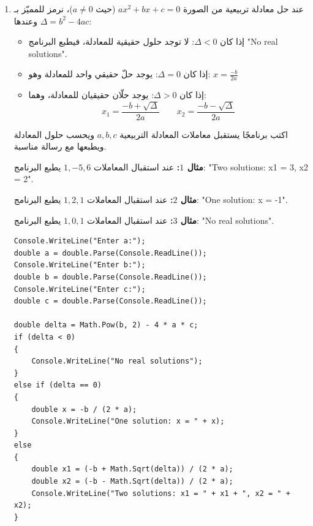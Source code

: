 \documentclass[14pt]{extarticle}
\begin{document}
\begin{enumerate}[resume, itemsep=2.2em]
\item
عند حل معادلة تربيعية من الصورة $ax^2 + bx + c = 0$ (حيث $a \neq 0$)، نرمز للمميّز بـ $\Delta = b^2 - 4ac$ وعندها:
\begin{itemize}[nosep]
    \item إذا كان $\Delta < 0$: لا توجد حلول حقيقية للمعادلة، فيطبع البرنامج \textenglish{"No real solutions"}.
    \item إذا كان $\Delta = 0$: يوجد حلّ حقيقي واحد للمعادلة وهو:
    \( x = \frac{-b}{2a} \)
    \item إذا كان $\Delta > 0$: يوجد حلّان حقيقيان للمعادلة، وهما:
    \[ x_1 = \frac{-b + \sqrt{\Delta}}{2a} \qquad x_2 = \frac{-b - \sqrt{\Delta}}{2a} \]
\end{itemize}
اكتب برنامجًا يستقبل معاملات المعادلة التربيعية $a, b, c$ ويحسب حلول المعادلة ويطبعها مع رسالة مناسبة.

\textbf{مثال $1$:} عند استقبال المعاملات $1, -5, 6$ يطبع البرنامج:
\textenglish{"Two solutions: x1 = 3, x2 = 2"}.

\textbf{مثال $2$:} عند استقبال المعاملات $1, 2, 1$ يطبع البرنامج:
\textenglish{"One solution: x = -1"}.

\textbf{مثال $3$:} عند استقبال المعاملات $1, 0, 1$ يطبع البرنامج:
\textenglish{"No real solutions"}.

\ifwithsols
\begin{boxSolution}
\begin{english}
\begin{verbatim}
Console.WriteLine("Enter a:");
double a = double.Parse(Console.ReadLine());
Console.WriteLine("Enter b:");
double b = double.Parse(Console.ReadLine());
Console.WriteLine("Enter c:");
double c = double.Parse(Console.ReadLine());

double delta = Math.Pow(b, 2) - 4 * a * c;
if (delta < 0)
{
    Console.WriteLine("No real solutions");
}
else if (delta == 0)
{
    double x = -b / (2 * a);
    Console.WriteLine("One solution: x = " + x);
}
else
{
    double x1 = (-b + Math.Sqrt(delta)) / (2 * a);
    double x2 = (-b - Math.Sqrt(delta)) / (2 * a);
    Console.WriteLine("Two solutions: x1 = " + x1 + ", x2 = " + x2);
}
\end{verbatim}
\end{english}
\end{boxSolution}
\fi
\filbreak


\end{enumerate}
\end{document}
